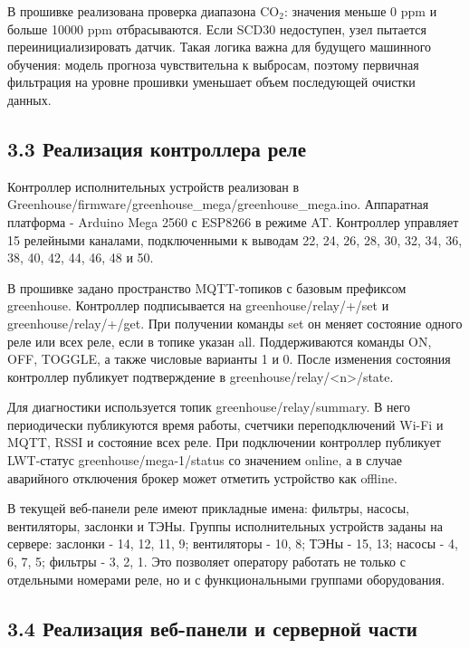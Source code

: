 \documentclass[a4paper,14pt]{extarticle}
\renewcommand{\texttt}[1]{\textnormal{#1}}
\begin{document}
В прошивке реализована проверка диапазона CO\(_2\): значения меньше 0
ppm и больше 10000 ppm отбрасываются. Если SCD30 недоступен, узел
пытается переинициализировать датчик. Такая логика важна для будущего
машинного обучения: модель прогноза чувствительна к выбросам, поэтому
первичная фильтрация на уровне прошивки уменьшает объем последующей
очистки данных.

\subsection{3.3 Реализация контроллера
реле}\label{ux440ux435ux430ux43bux438ux437ux430ux446ux438ux44f-ux43aux43eux43dux442ux440ux43eux43bux43bux435ux440ux430-ux440ux435ux43bux435}

Контроллер исполнительных устройств реализован в
\texttt{Greenhouse/firmware/greenhouse\_mega/greenhouse\_mega.ino}.
Аппаратная платформа - Arduino Mega 2560 с ESP8266 в режиме AT.
Контроллер управляет 15 релейными каналами, подключенными к выводам 22,
24, 26, 28, 30, 32, 34, 36, 38, 40, 42, 44, 46, 48 и 50.

В прошивке задано пространство MQTT-топиков с базовым префиксом
\texttt{greenhouse}. Контроллер подписывается на
\texttt{greenhouse/relay/+/set} и \texttt{greenhouse/relay/+/get}. При
получении команды \texttt{set} он меняет состояние одного реле или всех
реле, если в топике указан \texttt{all}. Поддерживаются команды
\texttt{ON}, \texttt{OFF}, \texttt{TOGGLE}, а также числовые варианты
\texttt{1} и \texttt{0}. После изменения состояния контроллер публикует
подтверждение в
\texttt{greenhouse/relay/\textless{}n\textgreater{}/state}.

Для диагностики используется топик \texttt{greenhouse/relay/summary}. В
него периодически публикуются время работы, счетчики переподключений
Wi-Fi и MQTT, RSSI и состояние всех реле. При подключении контроллер
публикует LWT-статус \texttt{greenhouse/mega-1/status} со значением
\texttt{online}, а в случае аварийного отключения брокер может отметить
устройство как \texttt{offline}.

В текущей веб-панели реле имеют прикладные имена: фильтры, насосы,
вентиляторы, заслонки и ТЭНы. Группы исполнительных устройств заданы на
сервере: заслонки - 14, 12, 11, 9; вентиляторы - 10, 8; ТЭНы - 15, 13;
насосы - 4, 6, 7, 5; фильтры - 3, 2, 1. Это позволяет оператору работать
не только с отдельными номерами реле, но и с функциональными группами
оборудования.

\subsection{3.4 Реализация веб-панели и серверной
части}\label{ux440ux435ux430ux43bux438ux437ux430ux446ux438ux44f-ux432ux435ux431-ux43fux430ux43dux435ux43bux438-ux438-ux441ux435ux440ux432ux435ux440ux43dux43eux439-ux447ux430ux441ux442ux438}
\end{document}
